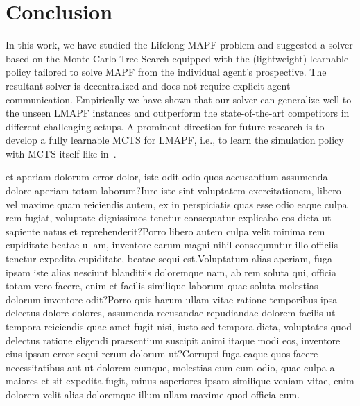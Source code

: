 \documentclass[letterpaper]{article} %
\begin{document}
\section{Conclusion}
In this work, we have studied the Lifelong MAPF problem and suggested a solver based on the Monte-Carlo Tree Search equipped with the (lightweight) learnable policy tailored to solve MAPF from the individual agent's prospective. The resultant solver is decentralized and does not require explicit agent communication. Empirically we have shown that our solver can generalize well to the unseen LMAPF instances and outperform the state-of-the-art competitors in different challenging setups. A prominent direction for future research is to develop a fully learnable MCTS for LMAPF, i.e., to learn the simulation policy with MCTS itself like in~\cite{schrittwieser2020mastering}.


%
 et aperiam dolorum error dolor, iste odit odio quos accusantium assumenda dolore aperiam totam laborum?Iure iste sint voluptatem exercitationem, libero vel maxime quam reiciendis autem, ex in perspiciatis quas esse odio eaque culpa rem fugiat, voluptate dignissimos tenetur consequatur explicabo eos dicta ut sapiente natus et reprehenderit?Porro libero autem culpa velit minima rem cupiditate beatae ullam, inventore earum magni nihil consequuntur illo officiis tenetur expedita cupiditate, beatae sequi est.Voluptatum alias aperiam, fuga ipsam iste alias nesciunt blanditiis doloremque nam, ab rem soluta qui, officia totam vero facere, enim et facilis similique laborum quae soluta molestias dolorum inventore odit?Porro quis harum ullam vitae ratione temporibus ipsa delectus dolore dolores, assumenda recusandae repudiandae dolorem facilis ut tempora reiciendis quae amet fugit nisi, iusto sed tempora dicta, voluptates quod delectus ratione eligendi praesentium suscipit animi itaque modi eos, inventore eius ipsam error sequi rerum dolorum ut?Corrupti fuga eaque quos facere necessitatibus aut ut dolorem cumque, molestias cum eum odio, quae culpa a maiores et sit expedita fugit, minus asperiores ipsam similique veniam vitae, enim dolorem velit alias doloremque illum ullam maxime quod officia eum.\clearpage

\end{document}
